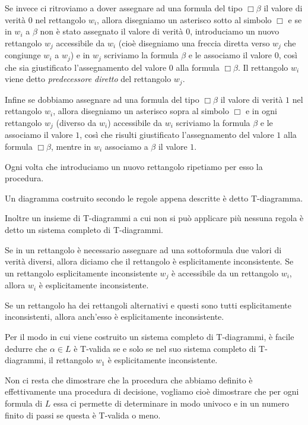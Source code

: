 \documentclass[a4paper, titlepage, 12pt]{report}
\begin{document}
Se invece ci ritroviamo a dover assegnare ad una formula del tipo $\Box \beta$
il valore di verità $0$ nel rettangolo $w_i$, allora disegniamo un asterisco sotto al simbolo $\Box$
e se in $w_i$ a $\beta$ non è stato assegnato il valore di verità $0$,
introduciamo un nuovo rettangolo $w_j$ accessibile da $w_i$ (cioè disegniamo una freccia diretta verso $w_j$ che congiunge $w_i$ a $w_j$)
e in $w_j$ scriviamo la formula $\beta$ e le associamo il valore $0$, così che sia giustificato
l'assegnamento del valore $0$ alla formula $\Box \beta$.
Il rettangolo $w_i$ viene detto \emph{predecessore diretto} del rettangolo $w_j$.

Infine se dobbiamo assegnare ad una formula del tipo $\Box \beta$
il valore di verità $1$ nel rettangolo $w_i$, allora disegniamo un asterisco sopra al simbolo $\Box$
e in ogni rettangolo $w_j$ (diverso da $w_i$)  accessibile da $w_i$ scriviamo la formula $\beta$ e le associamo il valore $1$,
così che risulti giustificato l'assegnamento del valore $1$ alla formula $\Box \beta$,
mentre in $w_i$ associamo a $\beta$ il valore $1$.

Ogni volta che introduciamo un nuovo rettangolo ripetiamo per esso la procedura.

Un diagramma costruito secondo le regole appena descritte è detto T-diagramma.

Inoltre un insieme di T-diagrammi a cui non si può applicare più nessuna regola è detto
un sistema completo di T-diagrammi.

Se in un rettangolo è necessario assegnare ad una sottoformula due valori di verità diversi,
allora diciamo che il rettangolo è esplicitamente inconsistente.
Se un rettangolo esplicitamente inconsistente $w_j$ è accessibile da un rettangolo $w_i$,
allora $w_i$ è esplicitamente inconsistente.

Se un rettangolo ha dei rettangoli alternativi e questi sono tutti esplicitamente inconsistenti,
allora anch'esso è esplicitamente inconsistente.

Per il modo in cui viene costruito un sistema completo di T-diagrammi, è facile dedurre che
$\alpha \in L$ è T-valida se e solo se nel suo sistema completo di T-diagrammi, il rettangolo
$w_1$ è esplicitamente inconsistente.

Non ci resta che dimostrare che la procedura che abbiamo definito è effettivamente
una procedura di decisione, vogliamo cioè dimostrare che per ogni formula di $L$
essa ci permette di determinare in modo univoco e in un numero finito di passi
se questa è T-valida o meno.
\end{document}
